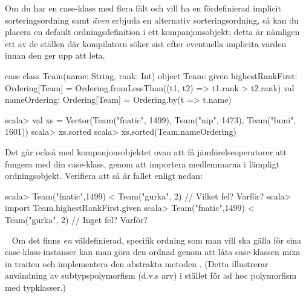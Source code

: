 \Subtask Om du har en case-klass med flera fält och vill ha en fördefinierad implicit sorteringsordning samt \emph{även} erbjuda en alternativ sorteringsordning, så kan du placera en default ordningsdefinition i ett kompanjonsobjekt; detta är nämligen ett av de ställen där kompilatorn söker sist efter eventuella implicita värden innan den ger upp att leta.
\begin{Code}
case class Team(name: String, rank: Int)
object Team:
  given highestRankFirst: Ordering[Team] = 
    Ordering.fromLessThan((t1, t2) => t1.rank > t2.rank)
  val nameOrdering: Ordering[Team] = Ordering.by(t => t.name)
\end{Code}
\begin{REPL}
scala> val xs =
         Vector(Team("fnatic", 1499), Team("nip", 1473), Team("lumi", 1601))
scala> xs.sorted
scala> xs.sorted(Team.nameOrdering)
\end{REPL}



\Subtask Det går också med kompanjonsobjektet ovan att få jämförelseoperatorer att fungera med din case-klass, genom att importera medlemmarna i lämpligt ordningsobjekt. Verifiera att så är fallet enligt nedan:
\begin{REPL}
scala> Team("fnatic",1499) < Team("gurka", 2)  // Vilket fel? Varför?
scala> import Team.highestRankFirst.given
scala> Team("fnatic",1499) < Team("gurka", 2)  // Inget fel? Varför?
\end{REPL}


\SOLUTION


\TaskSolved \what 

\SubtaskSolved \TODO

\SubtaskSolved \TODO

\SubtaskSolved \TODO

\SubtaskSolved \TODO


\QUESTEND







\QUESTBEGIN

\Task  \what~  Om det finns \emph{en} väldefinierad, specifik ordning som man vill ska gälla för sina case-klass-instanser kan man göra den ordnad genom att låta case-klassen mixa in traiten  och implementera den abstrakta metoden . (Detta illustrerar användning av subtypspolymorfism (d.v.s arv) i stället för ad hoc polymorfism med typklasser.)

